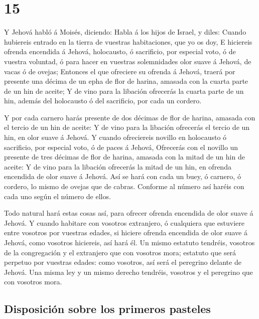 \hypertarget{section-14}{%
\section{15}\label{section-14}}

 Y Jehová habló á Moisés, diciendo:  Habla á
los hijos de Israel, y diles: Cuando hubiereis entrado en la tierra de
vuestras habitaciones, que yo os doy,  E hiciereis ofrenda
encendida á Jehová, holocausto, ó sacrificio, por especial voto, ó de
vuestra voluntad, ó para hacer en vuestras solemnidades olor suave á
Jehová, de vacas ó de ovejas;  Entonces el que ofreciere
su ofrenda á Jehová, traerá por presente una décima de un epha de flor
de harina, amasada con la cuarta parte de un hin de aceite;
 Y de vino para la libación ofrecerás la cuarta parte de
un hin, además del holocausto ó del sacrificio, por cada un cordero.

 Y por cada carnero harás presente de dos décimas de flor
de harina, amasada con el tercio de un hin de aceite:  Y
de vino para la libación ofrecerás el tercio de un hin, en olor suave á
Jehová.  Y cuando ofreciereis novillo en holocausto ó
sacrificio, por especial voto, ó de paces á Jehová, 
Ofrecerás con el novillo un presente de tres décimas de flor de harina,
amasada con la mitad de un hin de aceite:  Y de vino para
la libación ofrecerás la mitad de un hin, en ofrenda encendida de olor
suave á Jehová.  Así se hará con cada un buey, ó carnero,
ó cordero, lo mismo de ovejas que de cabras.  Conforme al
número así haréis con cada uno según el número de ellos.

 Todo natural hará estas cosas así, para ofrecer ofrenda
encendida de olor suave á Jehová.  Y cuando habitare con
vosotros extranjero, ó cualquiera que estuviere entre vosotros por
vuestras edades, si hiciere ofrenda encendida de olor suave á Jehová,
como vosotros hiciereis, así hará él.  Un mismo estatuto
tendréis, vosotros de la congregación y el extranjero que con vosotros
mora; estatuto que será perpetuo por vuestras edades: como vosotros, así
será el peregrino delante de Jehová.  Una misma ley y un
mismo derecho tendréis, vosotros y el peregrino que con vosotros mora.

\hypertarget{disposiciuxf3n-sobre-los-primeros-pasteles}{%
\subsection{Disposición sobre los primeros
pasteles}\label{disposiciuxf3n-sobre-los-primeros-pasteles}}

